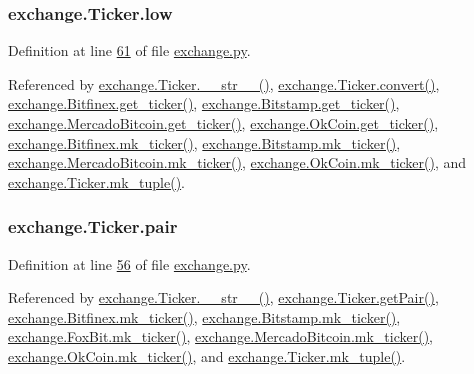 \subsubsection[{\texorpdfstring{low}{low}}]{\setlength{\rightskip}{0pt plus 5cm}exchange.\+Ticker.\+low}\hypertarget{classexchange_1_1_ticker_a1c1f26a47a82fc799fcebf158e104405}{}\label{classexchange_1_1_ticker_a1c1f26a47a82fc799fcebf158e104405}


Definition at line \hyperlink{exchange_8py_source_l00061}{61} of file \hyperlink{exchange_8py_source}{exchange.\+py}.



Referenced by \hyperlink{exchange_8py_source_l00111}{exchange.\+Ticker.\+\_\+\+\_\+str\+\_\+\+\_\+()}, \hyperlink{exchange_8py_source_l00065}{exchange.\+Ticker.\+convert()}, \hyperlink{exchange_8py_source_l00340}{exchange.\+Bitfinex.\+get\+\_\+ticker()}, \hyperlink{exchange_8py_source_l00409}{exchange.\+Bitstamp.\+get\+\_\+ticker()}, \hyperlink{exchange_8py_source_l00543}{exchange.\+Mercado\+Bitcoin.\+get\+\_\+ticker()}, \hyperlink{exchange_8py_source_l00608}{exchange.\+Ok\+Coin.\+get\+\_\+ticker()}, \hyperlink{exchange_8py_source_l00354}{exchange.\+Bitfinex.\+mk\+\_\+ticker()}, \hyperlink{exchange_8py_source_l00423}{exchange.\+Bitstamp.\+mk\+\_\+ticker()}, \hyperlink{exchange_8py_source_l00557}{exchange.\+Mercado\+Bitcoin.\+mk\+\_\+ticker()}, \hyperlink{exchange_8py_source_l00622}{exchange.\+Ok\+Coin.\+mk\+\_\+ticker()}, and \hyperlink{exchange_8py_source_l00096}{exchange.\+Ticker.\+mk\+\_\+tuple()}.

\subsubsection[{\texorpdfstring{pair}{pair}}]{\setlength{\rightskip}{0pt plus 5cm}exchange.\+Ticker.\+pair}\hypertarget{classexchange_1_1_ticker_a382f9199d13a7b5929a26065fad4e491}{}\label{classexchange_1_1_ticker_a382f9199d13a7b5929a26065fad4e491}


Definition at line \hyperlink{exchange_8py_source_l00056}{56} of file \hyperlink{exchange_8py_source}{exchange.\+py}.



Referenced by \hyperlink{exchange_8py_source_l00111}{exchange.\+Ticker.\+\_\+\+\_\+str\+\_\+\+\_\+()}, \hyperlink{exchange_8py_source_l00090}{exchange.\+Ticker.\+get\+Pair()}, \hyperlink{exchange_8py_source_l00354}{exchange.\+Bitfinex.\+mk\+\_\+ticker()}, \hyperlink{exchange_8py_source_l00423}{exchange.\+Bitstamp.\+mk\+\_\+ticker()}, \hyperlink{exchange_8py_source_l00482}{exchange.\+Fox\+Bit.\+mk\+\_\+ticker()}, \hyperlink{exchange_8py_source_l00557}{exchange.\+Mercado\+Bitcoin.\+mk\+\_\+ticker()}, \hyperlink{exchange_8py_source_l00622}{exchange.\+Ok\+Coin.\+mk\+\_\+ticker()}, and \hyperlink{exchange_8py_source_l00096}{exchange.\+Ticker.\+mk\+\_\+tuple()}.

